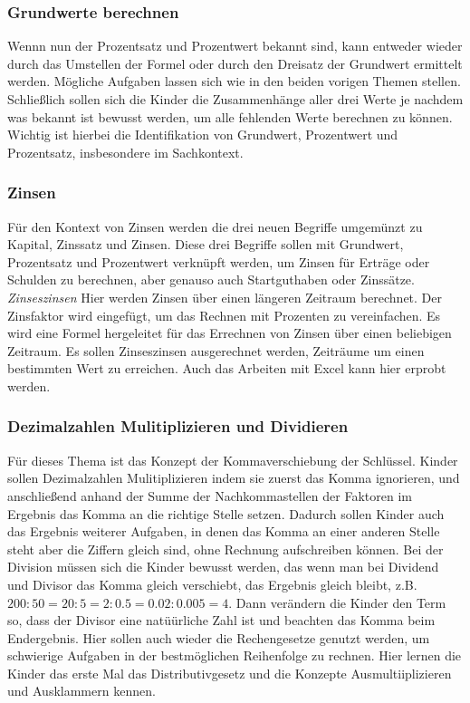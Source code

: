 \documentclass{article}
\begin{document}
\subsubsection*{Grundwerte berechnen}
Wennn nun der Prozentsatz und Prozentwert bekannt sind, kann entweder wieder durch das Umstellen der Formel oder durch den Dreisatz der Grundwert ermittelt werden.
Mögliche Aufgaben lassen sich wie in den beiden vorigen Themen stellen. \\
Schließlich sollen sich die Kinder die Zusammenhänge aller drei Werte je nachdem was bekannt ist bewusst werden, um alle fehlenden Werte berechnen zu können.
Wichtig ist hierbei die Identifikation von Grundwert, Prozentwert und Prozentsatz, insbesondere im Sachkontext.
\subsubsection*{Zinsen}
Für den Kontext von Zinsen werden die drei neuen Begriffe umgemünzt zu Kapital, Zinssatz und Zinsen.
Diese drei Begriffe sollen mit Grundwert, Prozentsatz und Prozentwert verknüpft werden, um Zinsen für Erträge oder Schulden zu berechnen, aber genauso auch Startguthaben oder Zinssätze.
\textit{Zinseszinsen}
Hier werden Zinsen über einen längeren Zeitraum berechnet. Der Zinsfaktor wird eingefügt, um das Rechnen mit Prozenten zu vereinfachen.
Es wird eine Formel hergeleitet für das Errechnen von Zinsen über einen beliebigen Zeitraum.
Es sollen Zinseszinsen ausgerechnet werden, Zeiträume um einen bestimmten Wert zu erreichen. Auch das Arbeiten mit Excel kann hier erprobt werden.
\subsubsection*{Dezimalzahlen Mulitiplizieren und Dividieren}
Für dieses Thema ist das Konzept der Kommaverschiebung der Schlüssel.
Kinder sollen Dezimalzahlen Mulitiplizieren indem sie zuerst das Komma ignorieren, und anschließend anhand der Summe der Nachkommastellen der Faktoren im Ergebnis das Komma an die richtige Stelle setzen.
Dadurch sollen Kinder auch das Ergebnis weiterer Aufgaben, in denen das Komma an einer anderen Stelle steht aber die Ziffern gleich sind, ohne Rechnung aufschreiben können.
Bei der Division müssen sich die Kinder bewusst werden, das wenn man bei Dividend und Divisor das Komma gleich verschiebt, das Ergebnis gleich bleibt, z.B. $200 : 50 = 20:5 = 2:0.5 = 0.02 : 0.005 = 4$.
Dann verändern die Kinder den Term so, dass der Divisor eine natüürliche Zahl ist und beachten das Komma beim Endergebnis.
Hier sollen auch wieder die Rechengesetze genutzt werden, um schwierige Aufgaben in der bestmöglichen Reihenfolge zu rechnen.
Hier lernen die Kinder das erste Mal das Distributivgesetz und die Konzepte Ausmultiiplizieren und Ausklammern kennen.
\end{document}
